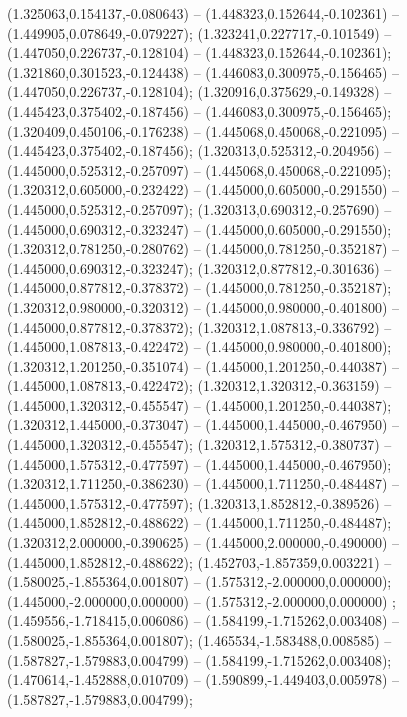  (1.325063,0.154137,-0.080643) -- (1.448323,0.152644,-0.102361) -- (1.449905,0.078649,-0.079227);
 (1.323241,0.227717,-0.101549) -- (1.447050,0.226737,-0.128104) -- (1.448323,0.152644,-0.102361);
 (1.321860,0.301523,-0.124438) -- (1.446083,0.300975,-0.156465) -- (1.447050,0.226737,-0.128104);
 (1.320916,0.375629,-0.149328) -- (1.445423,0.375402,-0.187456) -- (1.446083,0.300975,-0.156465);
 (1.320409,0.450106,-0.176238) -- (1.445068,0.450068,-0.221095) -- (1.445423,0.375402,-0.187456);
 (1.320313,0.525312,-0.204956) -- (1.445000,0.525312,-0.257097) -- (1.445068,0.450068,-0.221095);
 (1.320312,0.605000,-0.232422) -- (1.445000,0.605000,-0.291550) -- (1.445000,0.525312,-0.257097);
 (1.320313,0.690312,-0.257690) -- (1.445000,0.690312,-0.323247) -- (1.445000,0.605000,-0.291550);
 (1.320312,0.781250,-0.280762) -- (1.445000,0.781250,-0.352187) -- (1.445000,0.690312,-0.323247);
 (1.320312,0.877812,-0.301636) -- (1.445000,0.877812,-0.378372) -- (1.445000,0.781250,-0.352187);
 (1.320312,0.980000,-0.320312) -- (1.445000,0.980000,-0.401800) -- (1.445000,0.877812,-0.378372);
 (1.320312,1.087813,-0.336792) -- (1.445000,1.087813,-0.422472) -- (1.445000,0.980000,-0.401800);
 (1.320312,1.201250,-0.351074) -- (1.445000,1.201250,-0.440387) -- (1.445000,1.087813,-0.422472);
 (1.320312,1.320312,-0.363159) -- (1.445000,1.320312,-0.455547) -- (1.445000,1.201250,-0.440387);
 (1.320312,1.445000,-0.373047) -- (1.445000,1.445000,-0.467950) -- (1.445000,1.320312,-0.455547);
 (1.320312,1.575312,-0.380737) -- (1.445000,1.575312,-0.477597) -- (1.445000,1.445000,-0.467950);
 (1.320312,1.711250,-0.386230) -- (1.445000,1.711250,-0.484487) -- (1.445000,1.575312,-0.477597);
 (1.320313,1.852812,-0.389526) -- (1.445000,1.852812,-0.488622) -- (1.445000,1.711250,-0.484487);
 (1.320312,2.000000,-0.390625) -- (1.445000,2.000000,-0.490000) -- (1.445000,1.852812,-0.488622);
 (1.452703,-1.857359,0.003221) -- (1.580025,-1.855364,0.001807) -- (1.575312,-2.000000,0.000000);
 (1.445000,-2.000000,0.000000) -- (1.575312,-2.000000,0.000000) ;
 (1.459556,-1.718415,0.006086) -- (1.584199,-1.715262,0.003408) -- (1.580025,-1.855364,0.001807);
 (1.465534,-1.583488,0.008585) -- (1.587827,-1.579883,0.004799) -- (1.584199,-1.715262,0.003408);
 (1.470614,-1.452888,0.010709) -- (1.590899,-1.449403,0.005978) -- (1.587827,-1.579883,0.004799);

